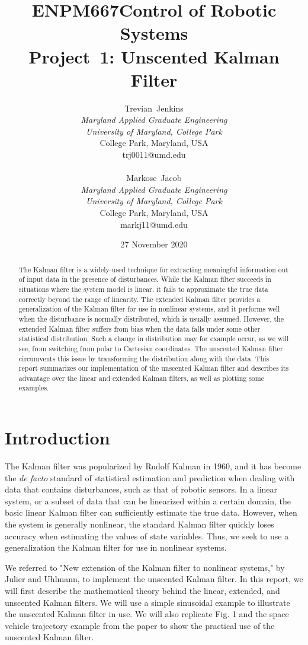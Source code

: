 \documentclass[]{article}
\title{ENPM667\textemdash Control of Robotic Systems \\ Project~1: Unscented Kalman Filter}
\author{{Trevian~Jenkins} \\
    {\textit{Maryland Applied Graduate Engineering}} \\
    {\textit{University of Maryland, College Park}} \\
    {College Park, Maryland, USA} \\
    {trj0011@umd.edu}
\\ \\
    {Markose~Jacob} \\
    {\textit{Maryland Applied Graduate Engineering}} \\
    {\textit{University of Maryland, College Park}} \\
    {College Park, Maryland, USA} \\
    {markj11@umd.edu}}
\date{27 November 2020}
\begin{document}
\maketitle
\thispagestyle{empty}

\begin{abstract}
The Kalman filter is a widely-used technique for extracting  meaningful information out of input data in the presence of disturbances. While the Kalman filter succeeds in situations where the system model is linear, it fails to approximate the true data correctly beyond the range of linearity. The extended Kalman filter provides a generalization of the Kalman filter for use in nonlinear systems, and it performs well when the disturbance is normally distributed, which is usually assumed.  However, the extended Kalman filter suffers from bias when the data falls under some other statistical distribution. Such a change in distribution may for example occur, as we will see, from switching from polar to Cartesian coordinates. The unscented Kalman filter circumvents this issue by transforming the distribution along with the data. This report summarizes our implementation of the unscented Kalman filter and describes its advantage over the linear and extended Kalman filters, as well as plotting some examples.
\end{abstract}

\newpage

\thispagestyle{empty}
\tableofcontents
\listoffigures

\newpage

\section{Introduction}
The Kalman filter was popularized by Rudolf Kalman in 1960, and it has become the \textit{de facto} standard of statistical estimation and prediction when dealing with data that contains disturbances, such as that of robotic sensors. In a linear system, or a subset of data that can be linearized within a certain domain, the basic linear Kalman filter can sufficiently estimate the true data. However, when the system is generally nonlinear, the standard Kalman filter quickly loses accuracy when estimating the values of state variables. Thus, we seek to use a generalization the Kalman filter for use in nonlinear systems.

We referred to "New extension of the Kalman filter to nonlinear systems," by Julier and Uhlmann, to implement the unscented Kalman filter. In this report, we will first describe the mathematical theory behind the linear, extended, and unscented Kalman filters. We will use a simple sinusoidal example to illustrate the unscented Kalman filter in use. We will also replicate Fig. 1 and the space vehicle trajectory example from the paper to show the practical use of the unscented Kalman filter.
\end{document}
